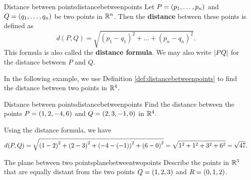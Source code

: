 \begin{definition}{Distance between points}{distancebetweenpoints}
  Let $P=\left(p_{1},\ldots,p_{n}\right)$ and $Q=\left(q_{1},\ldots,q_{n}\right)$ be
  two points in $\mathbb{R}^{n}$. Then the \textbf{distance}
  between these points is defined as
  \begin{equation*}
    d(P, Q) = \sqrt{(p_1-q_1)^2 + \ldots + (p_n-q_n)^2}.
  \end{equation*}
  This formula is also called the \textbf{distance
    formula}. We may also write $\left|PQ\right|$
  for the distance between $P$ and $Q$.
\end{definition}

In the following example, we use Definition
\ref{def:distancebetweenpoints} to find the distance between two
points in $\mathbb{R}^4$.

\begin{example}{Distance between points}{distancebetweenpoints}
  Find the distance between the points $P=\left(1,2,-4,6\right)$ and
  $Q=\left(2,3,-1,0\right)$ in $\mathbb{R}^{4}$.
\end{example}

\begin{solution}
  Using the distance formula, we have
  \begin{equation*}
    d(P,Q)= \sqrt{ \left(1-2\right) ^{2}+\left(2-3\right)
      ^{2}+\left(-4-\left(-1\right) \right) ^{2}+\left(6-0\right)^{2}} =
    \sqrt{1^2+1^2+3^2+6^2} = \sqrt{47}.
  \end{equation*}
\end{solution}

\begin{example}{The plane between two points}{planebetweentwopoints}
  Describe the points in $\mathbb{R}^3$ that are equally distant from the two
  points $Q=\left(1,2,3\right) $ and $R=\left(0,1,2\right)$.
\end{example}


